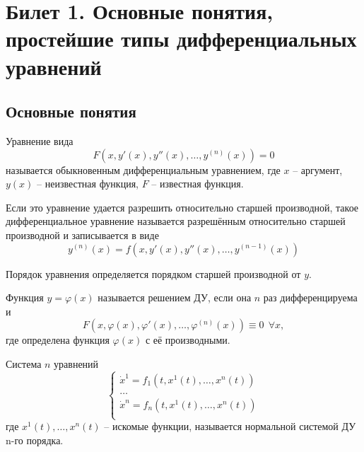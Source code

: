 \section{Билет 1. Основные понятия, простейшие типы дифференциальных уравнений}
\subsection{Основные понятия}

\begin{definition} 
    Уравнение вида \[F(x, y'(x), y''(x), \dots, y^{(n)}(x)) = 0\] называется обыкновенным дифференциальным уравнением,
    где $x$ -- аргумент, $y(x)$ -- неизвестная функция, $F$ -- известная функция.
\end{definition}

\begin{definition}
    Если это уравнение удается разрешить относительно старшей производной, такое дифференциальное
    уравнение называется разрешённым относительно старшей производной и записывается в виде
    \[y^{(n)}(x) = f(x, y'(x), y''(x), \dots, y^{(n-1)}(x))\]
\end{definition}

Порядок уравнения определяется порядком старшей производной от $y$.

\begin{definition}
    Функция $y = \varphi(x)$ называется решением ДУ, если она $n$ раз дифференцируема и 
    \[F(x, \varphi(x), \varphi'(x), \dots, \varphi^{(n)}(x)) \equiv 0 ~~ \forall x,\]
    где определена функция $\varphi(x)$ с её производными.
\end{definition}

\begin{definition}
    Система $n$ уравнений
    \begin{equation}
        \begin{cases}
            \dot x^1 = f_1(t, x^1(t), \dots, x^n(t)) \\
            \dots \\
            \dot x^n = f_n(t, x^1(t), \dots, x^n(t)) \\
        \end{cases}
    \end{equation}
    где $x^1(t), \dots, x^n(t)$ -- искомые функции, называется нормальной системой ДУ n-го порядка.
\end{definition}

